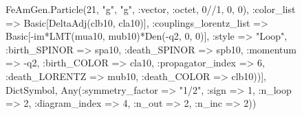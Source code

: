 \documentclass{revtex4}
\begin{document}
\begin{figure}[!htb]
\begin{center}
{FeAmGen.Particle(21, "g", "g", :vector, :octet, 0//1, 0, 0), :color_list => Basic[DeltaAdj(clb10, cla10)], :couplings_lorentz_list => Basic[-im*LMT(mua10, mub10)*Den(-q2, 0, 0)], :style => "Loop", :birth_SPINOR => spa10, :death_SPINOR => spb10, :momentum => -q2, :birth_COLOR => cla10, :propagator_index => 6, :death_LORENTZ => mub10, :death_COLOR => clb10))], Dict{Symbol, Any}(:symmetry_factor => "1/2", :sign => 1, :n_loop => 2, :diagram_index => 4, :n_out => 2, :n_inc => 2)) 
}
\end{center}
\end{figure}
\end{document}
